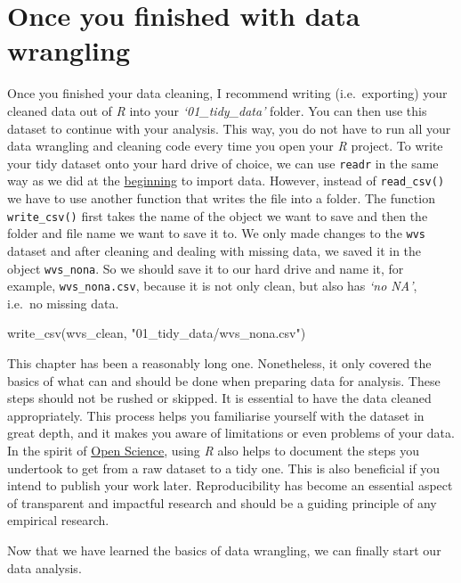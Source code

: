 \documentclass[
  letterpaper,
  DIV=11,
  numbers=noendperiod]{scrreprt}
\newenvironment{Shaded}{\begin{snugshade}}{\end{snugshade}}
\newcommand{\FunctionTok}[1]{\textcolor[rgb]{0.28,0.35,0.67}{#1}}
\newcommand{\NormalTok}[1]{\textcolor[rgb]{0.00,0.23,0.31}{#1}}
\newcommand{\StringTok}[1]{\textcolor[rgb]{0.13,0.47,0.30}{#1}}
\begin{document}
\section{Once you finished with data
wrangling}\label{sec-conclusion-data-wrangling}

Once you finished your data cleaning, I recommend writing
(i.e.~exporting) your cleaned data out of \emph{R} into your
\emph{`01\_tidy\_data'} folder. You can then use this dataset to
continue with your analysis. This way, you do not have to run all your
data wrangling and cleaning code every time you open your \emph{R}
project. To write your tidy dataset onto your hard drive of choice, we
can use \texttt{readr} in the same way as we did at the
\hyperref[importing-data-using-functions]{beginning} to import data.
However, instead of \texttt{read\_csv()} we have to use another function
that writes the file into a folder. The function \texttt{write\_csv()}
first takes the name of the object we want to save and then the folder
and file name we want to save it to. We only made changes to the
\texttt{wvs} dataset and after cleaning and dealing with missing data,
we saved it in the object \texttt{wvs\_nona}. So we should save it to
our hard drive and name it, for example, \texttt{wvs\_nona.csv}, because
it is not only clean, but also has \emph{`no NA'}, i.e.~no missing data.

\begin{Shaded}
\begin{Highlighting}[]
\FunctionTok{write\_csv}\NormalTok{(wvs\_clean, }\StringTok{"01\_tidy\_data/wvs\_nona.csv"}\NormalTok{)}
\end{Highlighting}
\end{Shaded}

This chapter has been a reasonably long one. Nonetheless, it only
covered the basics of what can and should be done when preparing data
for analysis. These steps should not be rushed or skipped. It is
essential to have the data cleaned appropriately. This process helps you
familiarise yourself with the dataset in great depth, and it makes you
aware of limitations or even problems of your data. In the spirit of
\href{https://osf.io}{Open Science}, using \emph{R} also helps to
document the steps you undertook to get from a raw dataset to a tidy
one. This is also beneficial if you intend to publish your work later.
Reproducibility has become an essential aspect of transparent and
impactful research and should be a guiding principle of any empirical
research.

Now that we have learned the basics of data wrangling, we can finally
start our data analysis.
\end{document}
